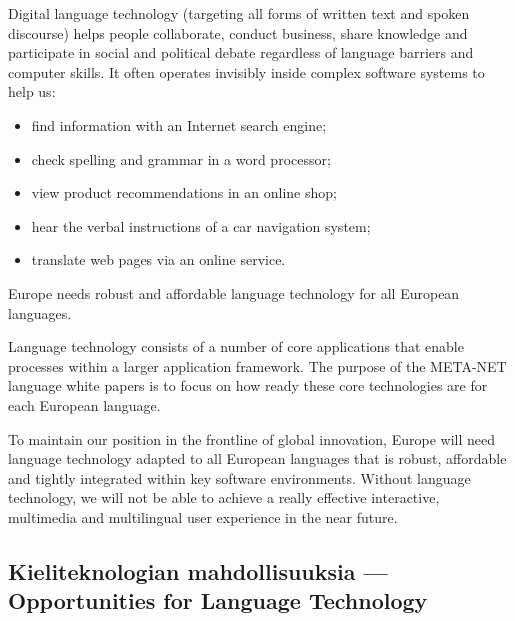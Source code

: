 \documentclass[]{../../metanetpaper}
\begin{document}
\begin{Parallel}[c]{70mm}{70mm}
{Digital language technology (targeting all forms of written text and spoken
discourse) helps people collaborate, conduct business, share knowledge and
participate in social and political debate regardless of language barriers and
computer skills. It often operates invisibly inside complex software systems to
help us:
\begin{itemize}
\item find information with an Internet search engine;

\item check spelling and grammar in a word processor;

\item view product recommendations in an online shop;

\item hear the verbal instructions of a car navigation system;

\item translate web pages via an online service.
\end{itemize}

Europe needs robust and affordable language technology for all European
languages.





Language technology consists of a number of core applications that
enable processes within a larger application framework. The purpose of
the META-NET language white papers is to focus on how ready these core
technologies are for each European language.

To maintain our position in the frontline of global innovation, Europe
will need language technology adapted to all European languages that
is robust, affordable and tightly integrated within key software
environments. Without language technology, we will not be able to
achieve a really effective interactive, multimedia and multilingual
user experience in the near future.
}

\ParallelPar

\subsection{Kieliteknologian mahdollisuuksia --- Opportunities for Language Technology}

\end{Parallel}
\end{document}
